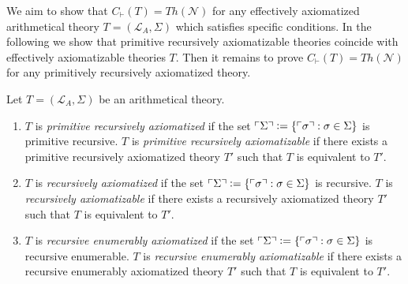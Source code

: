 We aim to show that $C_\vdash(T)=\mathit{Th}(\mathcal{N})$ for any effectively axiomatized arithmetical theory $T= (\mathcal{L}_A, \Sigma)$ which satisfies specific conditions. In the following we show that primitive recursively axiomatizable theories coincide with effectively axiomatizable theories $T$. Then it remains to prove $C_\vdash(T)=\mathit{Th}(\mathcal{N})$ for any primitively recursively axiomatized theory.


\begin{dfn}
Let $T = (\mathcal{L}_A, \Sigma)$ be an arithmetical theory.
\begin{enumerate}
\item $T$ is \textit{primitive recursively axiomatized} if the set $\ulcorner \Sigma \urcorner \vcentcolon= \lbrace \ulcorner \sigma \urcorner : \sigma \in \Sigma \rbrace$ is primitive recursive. $T$ is \textit{primitive recursively axiomatizable} if there exists a primitive recursively axiomatized theory $T'$ such that $T$ is equivalent to $T'$.
\item $T$ is \textit{recursively axiomatized} if the set $\ulcorner \Sigma \urcorner \vcentcolon= \lbrace \ulcorner \sigma \urcorner : \sigma \in \Sigma \rbrace$ is recursive. $T$ is \textit{recursively axiomatizable} if there exists a recursively axiomatized theory $T'$ such that $T$ is equivalent to $T'$.
\item $T$ is \textit{recursive enumerably axiomatized} if the set $\ulcorner \Sigma \urcorner \vcentcolon= \lbrace \ulcorner \sigma \urcorner : \sigma \in \Sigma \rbrace$ is recursive enumerable. $T$ is \textit{recursive enumerably axiomatizable} if there exists a recursive enumerably axiomatized theory $T'$ such that $T$ is equivalent to $T'$.
\end{enumerate}
\end{dfn}


